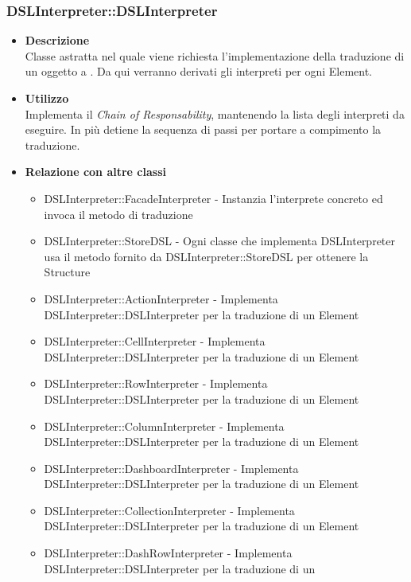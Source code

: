 \subsubsection{DSLInterpreter::DSLInterpreter}
\begin{itemize}
\item \textbf{Descrizione} \hfill \\
  Classe astratta nel quale viene richiesta l'implementazione della traduzione di un oggetto a . Da qui verranno derivati gli interpreti per ogni  Element.
\item \textbf{Utilizzo} \hfill \\
  Implementa il \textit{Chain of Responsability}, mantenendo la lista degli interpreti da eseguire. In più detiene la sequenza di passi per portare a compimento la traduzione.
\item \textbf{Relazione con altre classi} \hfill
  \begin{itemize}
  \item DSLInterpreter::FacadeInterpreter - Instanzia l'interprete concreto ed invoca il metodo di traduzione
  \item DSLInterpreter::StoreDSL - Ogni classe che implementa DSLInterpreter usa il metodo fornito da DSLInterpreter::StoreDSL per ottenere la  Structure
  \item DSLInterpreter::ActionInterpreter - Implementa DSLInterpreter::DSLInterpreter per la traduzione di un  Element
  \item DSLInterpreter::CellInterpreter - Implementa DSLInterpreter::DSLInterpreter per la traduzione di un  Element
  \item DSLInterpreter::RowInterpreter - Implementa DSLInterpreter::DSLInterpreter per la traduzione di un  Element
  \item DSLInterpreter::ColumnInterpreter - Implementa DSLInterpreter::DSLInterpreter per la traduzione di un  Element
  \item DSLInterpreter::DashboardInterpreter - Implementa DSLInterpreter::DSLInterpreter per la traduzione di un  Element
  \item DSLInterpreter::CollectionInterpreter - Implementa DSLInterpreter::DSLInterpreter per la traduzione di un  Element
  \item DSLInterpreter::DashRowInterpreter - Implementa DSLInterpreter::DSLInterpreter per la traduzione di un 

\end{itemize}
\end{itemize}
